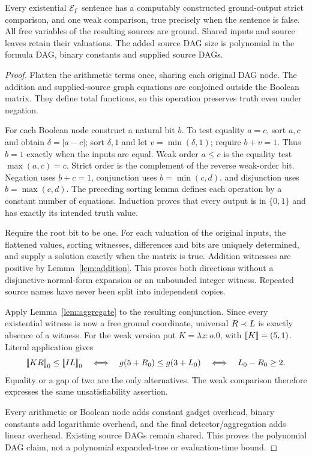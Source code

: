 \begin{theorem}\label{thm:compiler}
Every existential $\mathcal E_f$ sentence has a computably constructed ground-output
strict comparison, and one weak comparison, true precisely when the sentence
is false.  All free variables of the resulting sources are ground.  Shared
inputs and source leaves retain their valuations.  The added source DAG size
is polynomial in the formula DAG, binary constants and supplied source DAGs.
\end{theorem}
\begin{proof}
Flatten the arithmetic terms once, sharing each original DAG node.  The
addition and supplied-source graph equations are conjoined outside the
Boolean matrix.  They define total functions, so this operation preserves
truth even under negation.

For each Boolean node construct a natural bit $b$.  To test equality $a=c$,
sort $a,c$ and obtain $\delta=|a-c|$; sort $\delta,1$ and let
$v=\min(\delta,1)$; require $b+v=1$.  Thus $b=1$ exactly when the inputs
are equal.  Weak order $a\le c$ is the equality test $\max(a,c)=c$.
Strict order is the complement of the reverse weak-order bit.  Negation
uses $b+c=1$, conjunction uses $b=\min(c,d)$, and disjunction uses
$b=\max(c,d)$.  The preceding sorting lemma defines each operation by a
constant number of equations.  Induction proves that every output is in
$\{0,1\}$ and has exactly its intended truth value.

Require the root bit to be one.  For each valuation of the original inputs,
the flattened values, sorting witnesses, differences and bits are uniquely
determined, and supply a solution exactly when the matrix is true.  Addition
witnesses are positive by Lemma~\ref{lem:addition}.  This proves both directions
without a disjunctive-normal-form expansion or an unbounded integer witness.
Repeated source names have never been split into independent copies.

Apply Lemma~\ref{lem:aggregate} to the resulting conjunction.  Since every
existential witness is now a free ground coordinate, universal $R\prec L$
is exactly absence of a witness.  For the weak version put
$K=\lambda z:o.0$, with $\mathopen{[\![}K\mathclose{]\!]}=(5,1)$.  Literal application gives
\[
 \mathopen{[\![}KR\mathclose{]\!]}_0\le\mathopen{[\![}IL\mathclose{]\!]}_0
 \quad\Longleftrightarrow\quad g(5+R_0)\le g(3+L_0)
 \quad\Longleftrightarrow\quad L_0-R_0\ge2.
\]
Equality or a gap of two are the only alternatives.  The weak comparison
therefore expresses the same unsatisfiability assertion.

Every arithmetic or Boolean node adds constant gadget overhead, binary
constants add logarithmic overhead, and the final detector/aggregation adds
linear overhead.  Existing source DAGs remain shared.  This proves the
polynomial DAG claim, not a polynomial expanded-tree or evaluation-time bound.
\end{proof}


